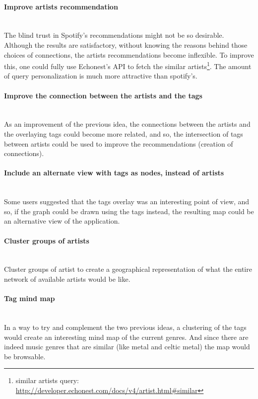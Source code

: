   \paragraph*{Improve artists recommendation} \hfill \\
  \indent The blind trust in Spotify's recommendations might not be so desirable.
  Although the results are satisfactory, without knowing the reasons behind those choices of connections, the artists recommendations become inflexible.
  To improve this, one could fully use Echonest's API to fetch the similar artists\footnote{similar artists query: \url{http://developer.echonest.com/docs/v4/artist.html\#similar}}.
  The amount of query personalization is much more attractive than spotify's. \\

  \paragraph*{Improve the connection between the artists and the tags} \hfill \\
  \indent As an improvement of the previous idea, the connections between the artists and the overlaying tags could become more related, and so, the intersection of tags between artists could be used to improve the recommendations (creation of connections).  \\

  \paragraph*{Include an alternate view with tags as nodes, instead of artists} \hfill \\
  \indent Some users suggested that the tags overlay was an interesting point of view, and so, if the graph could be drawn using the tags instead, the resulting map could be an alternative view of the application. \\

  \paragraph*{Cluster groups of artists} \hfill \\
  \indent Cluster groups of artist to create a geographical representation of what the entire network of available artists would be like. \\

  \paragraph*{Tag mind map} \hfill \\
  \indent In a way to try and complement the two previous ideas, a clustering of the tags would create an interesting mind map of the current genres.
  And since there are indeed music genres that are similar (like metal and celtic metal) the map would be browsable. \\


